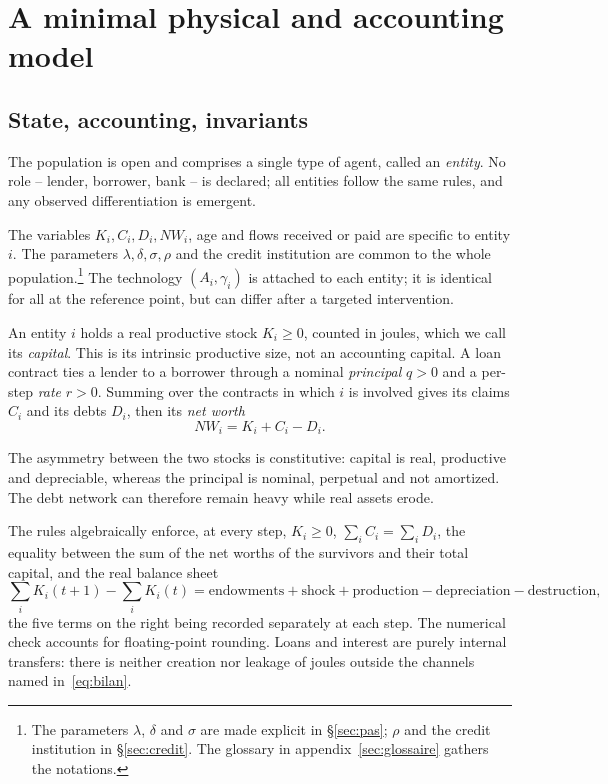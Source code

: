 \section{A minimal physical and accounting model}\label{sec:modele}


\subsection{State, accounting, invariants}

The population is open and comprises a single type of agent, called an
\emph{entity}. No role -- lender, borrower, bank -- is declared;
all entities follow the same rules, and any observed differentiation
is emergent.

The variables $K_i,C_i,D_i,NW_i$, age and flows received or paid are
specific to entity $i$. The parameters $\lambda,\delta,\sigma,\rho$ and
the credit institution are common to the whole population.\footnote{The
parameters $\lambda$, $\delta$ and $\sigma$ are made explicit in
\S\ref{sec:pas}; $\rho$ and the credit institution in \S\ref{sec:credit}.
The glossary in appendix~\ref{sec:glossaire} gathers the notations.} The technology
$(A_i,\gamma_i)$ is attached to each entity; it is identical for all
at the reference point, but can differ after a targeted intervention.

An entity $i$ holds a real productive stock $K_i \ge 0$, counted in
joules, which we call its \emph{capital}. This is its intrinsic
productive size, not an accounting capital. A loan contract ties a
lender to a borrower through a nominal \emph{principal} $q > 0$ and a
per-step \emph{rate} $r > 0$. Summing over the contracts in which $i$
is involved gives its claims $C_i$ and its debts $D_i$, then its
\emph{net worth}
\begin{equation}
NW_i = K_i + C_i - D_i .
\label{eq:nw}
\end{equation}

The asymmetry between the two stocks is constitutive: capital is real,
productive and depreciable, whereas the principal is nominal, perpetual
and not amortized. The debt network can therefore remain heavy while
real assets erode.

The rules algebraically enforce, at every step, $K_i \ge 0$,
$\sum_i C_i = \sum_i D_i$, the equality between the sum of the net
worths of the survivors and their total capital, and the real balance
sheet
\begin{equation}
\sum_i K_i(t{+}1) - \sum_i K_i(t) = \text{endowments} + \text{shock}
  + \text{production} - \text{depreciation} - \text{destruction},
\label{eq:bilan}
\end{equation}
the five terms on the right being recorded separately at each step.
The numerical check accounts for floating-point rounding.
Loans and interest are purely internal transfers: there is neither
creation nor leakage of joules outside the channels named
in~\eqref{eq:bilan}.

